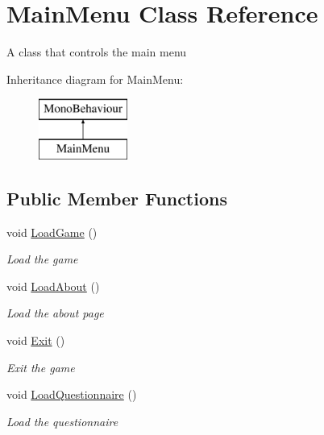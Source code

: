 \hypertarget{class_main_menu}{}\section{Main\+Menu Class Reference}
\label{class_main_menu}


A class that controls the main menu  


Inheritance diagram for Main\+Menu\+:\begin{figure}[H]
\begin{center}
\leavevmode
\includegraphics[height=2.000000cm]{class_main_menu}
\end{center}
\end{figure}
\subsection*{Public Member Functions}
\begin{DoxyCompactItemize}
\item 
void \mbox{\hyperlink{class_main_menu_a5e5cf3c9a40d8c3af4a7afb06a4a3f89}{Load\+Game}} ()
\begin{DoxyCompactList}\small\item\em Load the game \end{DoxyCompactList}\item 
void \mbox{\hyperlink{class_main_menu_aeeb49c53aadae1b1608c7d24ea60fca3}{Load\+About}} ()
\begin{DoxyCompactList}\small\item\em Load the about page \end{DoxyCompactList}\item 
void \mbox{\hyperlink{class_main_menu_a2a6f329d1d69aa2ccd1703b061c4d51e}{Exit}} ()
\begin{DoxyCompactList}\small\item\em Exit the game \end{DoxyCompactList}\item 
void \mbox{\hyperlink{class_main_menu_a718238ca30f3203c53cd391a0881e543}{Load\+Questionnaire}} ()
\begin{DoxyCompactList}\small\item\em Load the questionnaire \end{DoxyCompactList}\end{DoxyCompactItemize}



